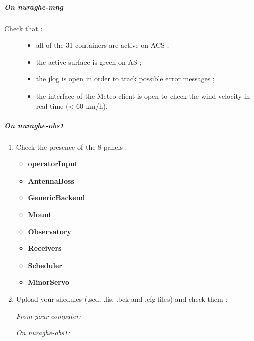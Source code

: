 \documentclass[letterpaper,10pt,english]{sphinxmanual}
\begin{document}
\subparagraph{On nuraghe-mng}
\label{SpectralLine/K-band/Xarcos/before-obs:on-nuraghe-mng}\begin{description}
\item[{Check that :}] \leavevmode\begin{itemize}
\item {} 
all of the 31 containers are active on ACS ;

\item {} 
the active surface is green on AS ;

\item {} 
the jlog is open in order to track possible error messages ;

\item {} 
the interface of the Meteo client is open to check the wind velocity in real time (\textless{} 60 km/h).

\end{itemize}

\end{description}


\subparagraph{On nuraghe-obs1}
\label{SpectralLine/K-band/Xarcos/before-obs:on-nuraghe-obs1}\begin{enumerate}
\item {} 
Check the presence of the 8 panels :
\begin{itemize}
\item {} 
\textbf{operatorInput}

\item {} 
\textbf{AntennaBoss}

\item {} 
\textbf{GenericBackend}

\item {} 
\textbf{Mount}

\item {} 
\textbf{Observatory}

\item {} 
\textbf{Receivers}

\item {} 
\textbf{Scheduler}

\item {} 
\textbf{MinorServo}

\end{itemize}

\end{enumerate}
\begin{enumerate}
\setcounter{enumi}{1}
\item {} 
Upload your shedules (.scd, .lis, .bck and .cfg files) and check them :

\emph{From your computer:}


\emph{On nuraghe-obs1:}



\end{enumerate}
\end{document}
